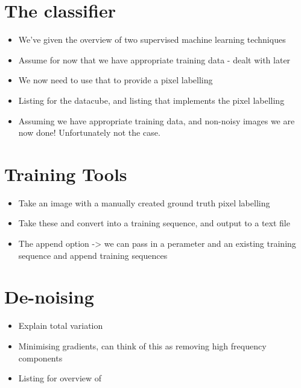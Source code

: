 \documentclass[12pt,twoside,notitlepage]{report}
\begin{document}
    \section{The classifier} \label{sec:pixel_label}
        \begin{itemize}
            \item We've given the overview of two supervised machine learning techniques
            \item Assume for now that we have appropriate training data - dealt with later
            \item We now need to use that to provide a pixel labelling
            \item Listing for the datacube, and listing that implements the pixel labelling
            \item Assuming we have appropriate training data, and non-noisy images we are now done! Unfortunately not the case.
        \end{itemize}

    \section{Training Tools} \label{sec:training_tools}
        \begin{itemize}
            \item Take an image with a manually created ground truth pixel labelling
            \item Take these and convert into a training sequence, and output to a text file
            \item The append option -> we can pass in a perameter and an existing training sequence and append training sequences
        \end{itemize}

    \section{De-noising} \label{sec:de-noising}
        \begin{itemize}
            \item Explain total variation
            \item Minimising gradients, can think of this as removing high frequency components
            \item Listing for overview of 
        \end{itemize}
\end{document}
